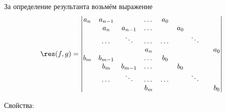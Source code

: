 За определение результанта возьмём выражение
$$
\res(f,g) = \left|\begin{matrix}
a_n & a_{n-1} &         & \dots & a_0   &     &        &     \\
    & a_n     & a_{n-1} & \dots &       & a_0 &        &     \\
    & \dots   & \ddots  & \dots & \dots &     & \ddots &     \\
    &         &         & a_n   &       &     & &      & a_0 \\
b_m & b_{m-1} &         & \dots & b_0   &     &        &     \\
    & b_m     & b_{m-1} & \dots &       & b_0 &        &     \\
    & \dots   & \ddots  & \dots & \dots &     & \ddots &     \\
    &         &         & b_m   &       &     & &      & b_0
\end{matrix}\right|
$$

Свойства:


